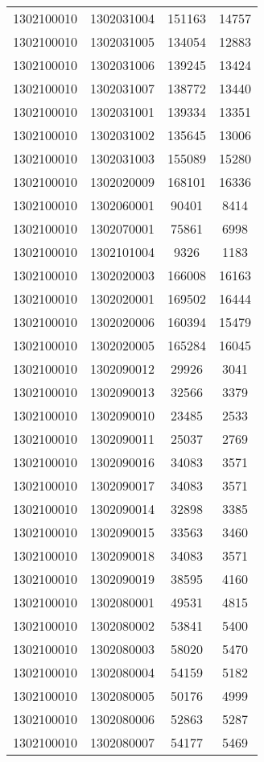 \begin{longtable}[h]{llcc}
		1302100010 & 1302031004 & 151163 & 14757\\
		1302100010 & 1302031005 & 134054 & 12883\\
		1302100010 & 1302031006 & 139245 & 13424\\
		1302100010 & 1302031007 & 138772 & 13440\\
		1302100010 & 1302031001 & 139334 & 13351\\
		1302100010 & 1302031002 & 135645 & 13006\\
		1302100010 & 1302031003 & 155089 & 15280\\
		1302100010 & 1302020009 & 168101 & 16336\\
		1302100010 & 1302060001 & 90401 & 8414\\
		1302100010 & 1302070001 & 75861 & 6998\\
		1302100010 & 1302101004 & 9326 & 1183\\
		1302100010 & 1302020003 & 166008 & 16163\\
		1302100010 & 1302020001 & 169502 & 16444\\
		1302100010 & 1302020006 & 160394 & 15479\\
		1302100010 & 1302020005 & 165284 & 16045\\
		1302100010 & 1302090012 & 29926 & 3041\\
		1302100010 & 1302090013 & 32566 & 3379\\
		1302100010 & 1302090010 & 23485 & 2533\\
		1302100010 & 1302090011 & 25037 & 2769\\
		1302100010 & 1302090016 & 34083 & 3571\\
		1302100010 & 1302090017 & 34083 & 3571\\
		1302100010 & 1302090014 & 32898 & 3385\\
		1302100010 & 1302090015 & 33563 & 3460\\
		1302100010 & 1302090018 & 34083 & 3571\\
		1302100010 & 1302090019 & 38595 & 4160\\
		1302100010 & 1302080001 & 49531 & 4815\\
		1302100010 & 1302080002 & 53841 & 5400\\
		1302100010 & 1302080003 & 58020 & 5470\\
		1302100010 & 1302080004 & 54159 & 5182\\
		1302100010 & 1302080005 & 50176 & 4999\\
		1302100010 & 1302080006 & 52863 & 5287\\
		1302100010 & 1302080007 & 54177 & 5469\\

\end{longtable}
